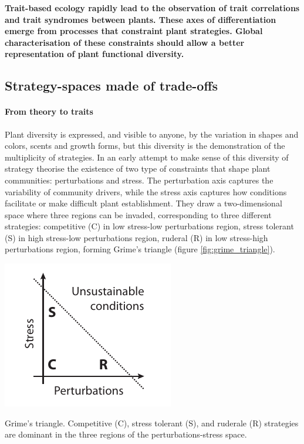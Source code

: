 \textbf{Trait-based ecology rapidly lead to the observation of trait correlations and trait syndromes between plants. These axes of differentiation emerge from processes that constraint plant strategies. Global characterisation of these constraints should allow a better representation of plant functional diversity.}

\subsection{Strategy-spaces made of trade-offs}

\paragraph{From theory to traits}

Plant diversity is expressed, and visible to anyone, by the variation in shapes and colors, scents and growth forms, but this diversity is the demonstration of the multiplicity of strategies. In an early attempt to make sense of this diversity of strategy \cite{grime_evidence_1977} theorise the existence of two type of constraints that shape plant communities: perturbations and stress. The perturbation axis captures the variability of community drivers, while the stress axis captures how conditions facilitate or make difficult plant establishment. They draw a two-dimensional space where three regions can be invaded, corresponding to three different strategies: competitive (C) in low stress-low perturbations region, stress tolerant (S) in high stress-low perturbations region, ruderal (R) in low stress-high perturbations region, forming Grime's triangle (\see figure \ref{fig:grime_triangle}).

\begin{marginfigure}
    \includegraphics{./Figures/Grime_triangle.pdf}
  \caption[Diversity insurance effect]{Grime's triangle. Competitive (C), stress tolerant (S), and ruderale (R) strategies are dominant in the three regions of the perturbations-stress space.}
  \label{fig:grime_triangle}
\end{marginfigure}

